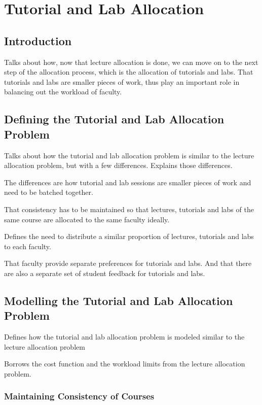 \chapter{Tutorial and Lab Allocation}

\section{Introduction}

Talks about how, now that lecture allocation is done, we can move on to the next step of the allocation process, which is the allocation of tutorials and labs. That tutorials and labs are smaller pieces of work, thus play an important role in balancing out the workload of faculty.

\section{Defining the Tutorial and Lab Allocation Problem}

Talks about how the tutorial and lab allocation problem is similar to the lecture allocation problem, but with a few differences. Explains those differences.

The differences are how tutorial and lab sessions are smaller pieces of work and need to be batched together.

That consistency has to be maintained so that lectures, tutorials and labs of the same course are allocated to the same faculty ideally.

Defines the need to distribute a similar proportion of lectures, tutorials and labs to each faculty.

That faculty provide separate preferences for tutorials and labs. And that there are also a separate set of student feedback for tutorials and labs.

\section{Modelling the Tutorial and Lab Allocation Problem}

Defines how the tutorial and lab allocation problem is modeled similar to the lecture allocation problem

Borrows the cost function and the workload limits from the lecture allocation problem.

\subsection{Maintaining Consistency of Courses}

